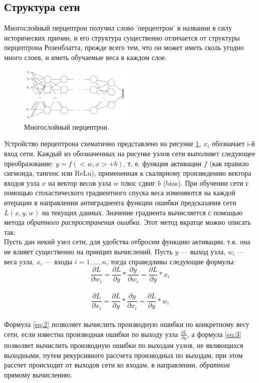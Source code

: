 \documentclass[12pt, oneside]{extbook}
\begin{document}
\begin{flushleft}
\section{Структура сети}
Многослойный перцептрон получил слово 'перцептрон' в названии в силу исторических причин, и его структура существенно отличается от структуры перцептрона Розенблатта, прежде всего тем, что он может иметь сколь угодно много слоев, и иметь обучаемые веса в каждом слое.
\begin{figure}[h]
\centering
\includegraphics[width=0.5\textwidth]{multi_layer_perceptron_general}
\caption{Многослойный перцептрон.}
\label{fig:multi_perceptron}
\end{figure}
\par
Устройство перцептрона схематично представлено на рисунке \ref{fig:multi_perceptron}, $x_i$ обозначает i-й вход сети. Каждый из обозначенных на рисунке узлов сети выполняет следующее преобразование: $y = f(<w, x> + b)$, т. е. функция активации $f$ (как правило сигмоида, тангенс или ReLu), примененная к скалярному произведению вектора входов узла $x$ на вектор весов узла $w$ плюс сдвиг $b$ (bias). При обучении сети с помощью стохастического градиентного спуска веса изменяются на каждой итерации в направлении антиградиента функции ошибки предсказания сети $L(x, y, w)$ на текущих данных. Значение градиента вычисляется с помощью метода \textit{обратного распространения ошибки}. Этот метод вкратце можно описать так:\\
Пусть дан некий узел сети, для удобства отбросим функцию активации, т.к. она не влияет существенно на принцип вычислений. Пусть $y$ --- выход узла, $w_{i}$ --- веса узла, $x_{i}$ --- входы $i=1,...,n$, тогда справедливы следующие формулы:\\
\begin{equation} \label {eq:2}
\frac{\partial L}{\partial w_{i}} = \frac{\partial L}{\partial y} * \frac{\partial y}{\partial w_{i}} = \frac{\partial L}{\partial y} * x_{i}
\end{equation}\\
\begin{equation} \label {eq:3}
\frac{\partial L}{\partial x_{i}} = \frac{\partial L}{\partial y} * \frac{\partial y}{\partial x_{i}} = \frac{\partial L}{\partial y} * w_{i}
\end{equation}\\
Формула \ref{eq:2} позволяет вычислить производную ошибки по конкретному весу сети, если известна производная ошибки по выходу узла $\frac{\partial L}{\partial y}$, а формула \ref{eq:3} позволяет вычислить производную ошибки по выходам узлов, не являющихся выходными, путем рекурсивного рассчета производных по выходам, при этом рассчет происходит от выходов сети ко входам, в направлении, \textit{обратном} прямому вычислению.

\end{flushleft}
\end{document}
